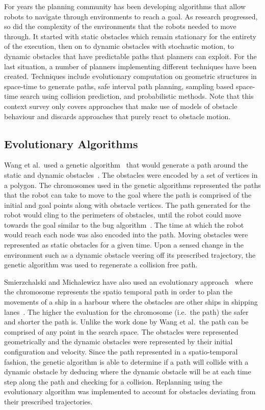 \documentclass[letterpaper, 10pt, conference]{ieeeconf}
\begin{document}
\label{chapter:contextsurvey}

For years the planning community has been developing algorithms that allow
robots to navigate through environments to reach a goal. As research
progressed, so did the complexity of the environments that the robots needed to
move through. It started with static obstacles which remain stationary for the
entirety of the execution, then on to dynamic obstacles with stochastic motion,
to dynamic obstacles that have predictable paths that planners can exploit. For
the last situation, a number of planners implementing different techniques have
been created. Techniques include evolutionary computation on geometric
structures in space-time to generate paths, safe interval path planning,
sampling based space-time search using collision prediction, and probabilistic
methods. Note that this context survey only covers approaches that make use of
models of obstacle behaviour and discards approaches that purely react to
obstacle motion.

\subsection{Evolutionary Algorithms}

Wang et al.\ used a genetic algorithm~\cite{galletly1992overview} that would
generate a path around the static and dynamic obstacles~\cite{wang2007mobile}.
The obstacles were encoded by a set of vertices in a polygon. The chromosomes
used in the genetic algorithms represented the paths that the robot can take to
move to the goal where the path is comprised of the initial and goal points
along with obstacle vertices.  The path generated for the robot would cling to
the perimeters of obstacles, until the robot could move towards the goal
similar to the bug algorithm~\cite{weir}. The time at which the robot would
reach each node was also encoded into the path. Moving obstacles were
represented as static obstacles for a given time. Upon a sensed change in the
environment such as a dynamic obstacle veering off its prescribed trajectory,
the genetic algorithm was used to regenerate a collision free path.

Smierzchalski and Michalewicz have also used an evolutionary
approach~\cite{evosurvey} where the chromosome represents the spatio temporal
path in order to plan the movements of a ship in a harbour where the obstacles
are other ships in shipping lanes~\cite{smierzchalski2005path}. The higher the
evaluation for the chromosome (i.e.\ the path) the safer and shorter the path
is. Unlike the work done by Wang et al.\ the path can be comprised of any point
in the search space.  The obstacles were represented geometrically and the
dynamic obstacles were represented by their initial configuration and velocity.
Since the path represented in a spatio-temporal fashion, the genetic algorithm
is able to determine if a path will collide with a dynamic obstacle by deducing
where the dynamic obstacle will be at each time step along the path and
checking for a collision.  Replanning using the evolutionary algorithm was
implemented to account for obstacles deviating from their prescribed
trajectories.
\end{document}
